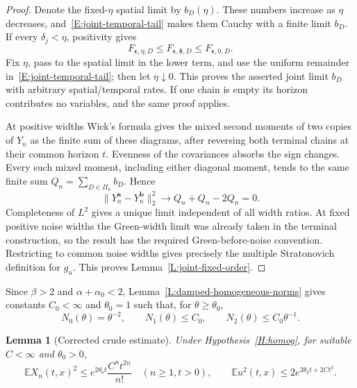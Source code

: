 \documentclass[12pt]{article}
\numberwithin{equation}{section}
\newtheorem{lemma}[theorem]{Lemma}
\theoremstyle{definition}
\newcommand{\E}{\mathbb{E}}
\begin{document}
\begin{proof}
  Denote the fixed-$\eta$ spatial limit by $b_D(\eta)$. These numbers
  increase as $\eta$ decreases, and~\eqref{E:joint-temporal-tail} makes
  them Cauchy with a finite limit $b_D$. If every $\delta_j<\eta$,
  positivity gives
  \[
    F_{\boldsymbol\epsilon,\eta,D}
    \le F_{\boldsymbol\epsilon,\boldsymbol\delta,D}
    \le F_{\boldsymbol\epsilon,0,D}.
  \]
  Fix $\eta$, pass to the spatial limit in the lower term, and use
  the uniform remainder in~\eqref{E:joint-temporal-tail}; then let
  $\eta\downarrow0$. This proves the asserted joint limit $b_D$ with
  arbitrary spatial/temporal rates. If one chain is empty its horizon
  contributes no variables, and the same proof applies.

  At positive widths Wick's formula gives the mixed second moments
  of two copies of $Y_n$ as the finite sum of these diagrams, after
  reversing both terminal chains at their common horizon $t$.
  Evenness of the covariances absorbs the sign changes. Every such
  mixed moment, including either diagonal moment, tends to the same
  finite sum $Q_n=\sum_{D\in\Pi_n}b_D$. Hence
  \[
    \|Y_n^{\boldsymbol a}-Y_n^{\boldsymbol b}\|_2^2
    \longrightarrow Q_n+Q_n-2Q_n=0.
  \]
  Completeness of $L^2$ gives a unique limit independent of all width
  ratios. At fixed positive noise widths the Green-width limit was
  already taken in the terminal construction, so the result has the
  required Green-before-noise convention. Restricting to common noise
  widths gives precisely the multiple Stratonovich definition for $g_n$.
  This proves Lemma~\ref{L:joint-fixed-order}.
\end{proof}

Since $\beta>2$ and $\alpha+\alpha_0<2$,
Lemma~\ref{L:damped-homogeneous-norms} gives constants
$C_0<\infty$ and $\theta_0=1$ such that, for $\theta\ge\theta_0$,
\begin{equation}\label{E:crude-norms}
  N_0(\theta)=\theta^{-2},\qquad
  N_1(\theta)\le C_0,\qquad N_2(\theta)\le C_0\theta^{-1}.
\end{equation}

\begin{lemma}[Corrected crude estimate]\label{L:crude-corrected}
  Under Hypothesis~\ref{H:homog}, for suitable $C<\infty$ and
  $\theta_0>0$,
  \begin{equation}\label{E:crude-corrected}
    \E X_n(t,x)^2\le e^{2\theta_0t}\frac{C^nt^{2n}}{n!}
    \quad(n\ge1,t>0),\qquad
    \E u^2(t,x)\le2e^{2\theta_0t+2Ct^2}.
  \end{equation}
\end{lemma}
\end{document}

